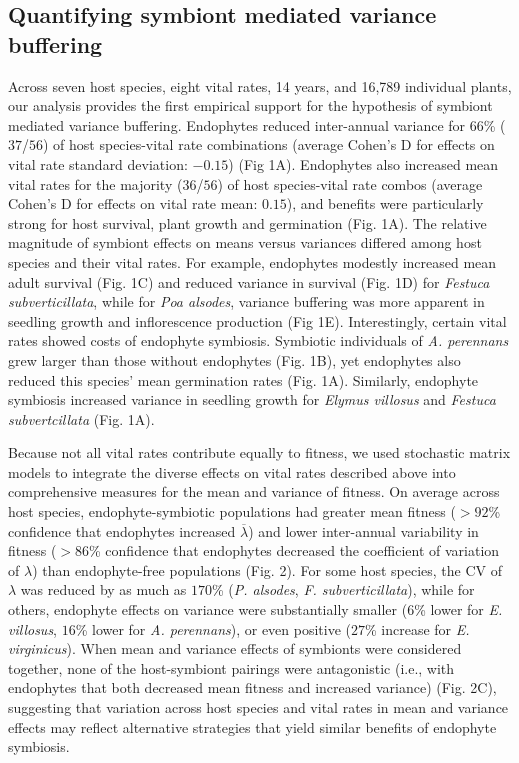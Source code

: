 \documentclass[9pt,twocolumn,twoside]{pnas-new}
\begin{document}
\subsection*{Quantifying symbiont mediated variance buffering}
Across seven host species, eight vital rates, 14 years, and 16,789 individual plants, our analysis provides the first empirical support for the hypothesis of symbiont mediated variance buffering. 
Endophytes reduced inter-annual variance for 66\% ($37$/$56$) of host species-vital rate combinations (average Cohen's D for effects on vital rate standard deviation: $-0.15$) (Fig 1A). 
Endophytes also increased mean vital rates for the majority ($36$/$56$) of host species-vital rate combos (average Cohen's D for effects on vital rate mean: $0.15$), and benefits were particularly strong for host survival, plant growth and germination (Fig. 1A).
The relative magnitude of symbiont effects on means versus variances differed among host species and their vital rates.
For example, endophytes modestly increased mean adult survival (Fig. 1C) and reduced variance in survival (Fig. 1D) for \emph{Festuca subverticillata}, while for \emph{Poa alsodes}, variance buffering was more apparent in seedling growth and inflorescence production (Fig 1E). 
Interestingly, certain vital rates showed costs of endophyte symbiosis. 
Symbiotic individuals of \emph{A. perennans} grew larger than those without endophytes (Fig. 1B), yet endophytes also reduced this species' mean germination rates (Fig. 1A). 
Similarly, endophyte symbiosis increased variance in seedling growth for \emph{Elymus villosus} and \emph{Festuca subvertcillata} (Fig. 1A).


Because not all vital rates contribute equally to fitness, we used stochastic matrix models to integrate the diverse effects on vital rates described above into comprehensive measures for the mean and variance of fitness. 
On average across host species, endophyte-symbiotic populations had greater mean fitness ($>92$\% confidence that endophytes increased $\overline{\lambda}$) and lower inter-annual variability in fitness ($>86$\% confidence that endophytes decreased the coefficient of variation of $\lambda$) than endophyte-free populations (Fig. 2).
For some host species, the CV of $\lambda$ was reduced by as much as $170$\% (\emph{P. alsodes}, \emph{F. subverticillata}), while for others, endophyte effects on variance were substantially smaller ($6$\% lower for \emph{E. villosus}, $16$\% lower for \emph{A. perennans}), or even positive ($27$\% increase for \emph{E. virginicus}).
When mean and variance effects of symbionts were considered together, none of the host-symbiont pairings were antagonistic (i.e., with endophytes that both decreased mean fitness and increased variance) (Fig. 2C), suggesting that variation across host species and vital rates in mean and variance effects may reflect alternative strategies that yield similar benefits of endophyte symbiosis.
\end{document}
